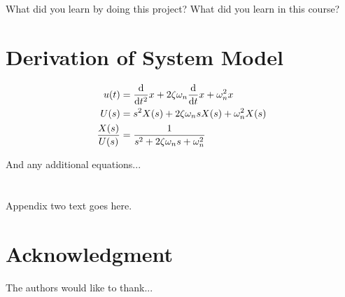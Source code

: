 \documentclass[conference,onecolumn]{IEEEtran}
\begin{document}
What did you learn by doing this project? 
What did you learn in this course?


\appendices

\section{Derivation of System Model}
\label{apx:sys_model_derivation}

\begin{align}
    u(t) &= \dv{t^2} x + 2 \zeta \omega_n \dv{t} x + \omega_n^2 x\\
    U(s) &= s^2 X(s) + 2 \zeta \omega_n s X(s) + \omega_n^2 X(s)\\
    \frac{X(s)}{U(s)} &= \frac{1}{s^2 + 2\zeta \omega_n s + \omega_n^2}
\end{align}

And any additional equations...

\section{}
Appendix two text goes here.


\section*{Acknowledgment}


The authors would like to thank...


{} 

\end{document}
